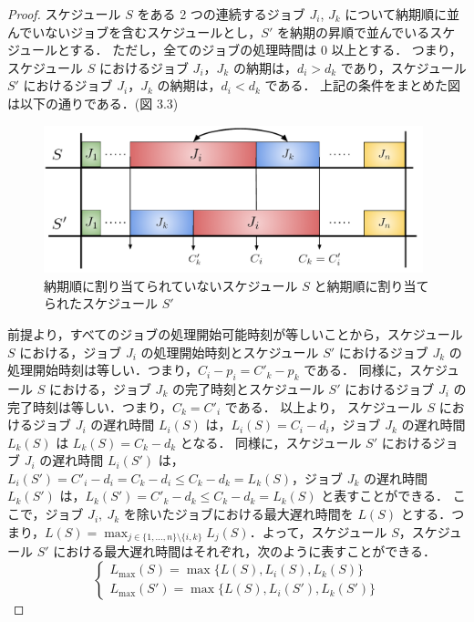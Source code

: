 \documentclass[12pt]{optlab-bachelor}
\begin{document}
\begin{proof}
  スケジュール $S$ をある 2 つの連続するジョブ $J_i$, $J_k$ について納期順に並んでいないジョブを含むスケジュールとし，$S'$ を納期の昇順で並んでいるスケジュールとする．
  ただし，全てのジョブの処理時間は 0 以上とする．
  つまり，スケジュール $S$ におけるジョブ $J_i$，$J_k$ の納期は，$d_i > d_k$ であり，スケジュール $S'$ におけるジョブ $J_i$，$J_k$ の納期は，$d_i < d_k$ である．
  上記の条件をまとめた図は以下の通りである．(図 3.3)

  \begin{figure}[h]
    \centering
    \includegraphics[width = 11cm]{figure/EDDrule.pdf}
    \caption{納期順に割り当てられていないスケジュール $S$ と納期順に割り当てられたスケジュール $S'$}
  \end{figure}

  前提より，すべてのジョブの処理開始可能時刻が等しいことから，スケジュール $S$ における，ジョブ $J_i$ の処理開始時刻とスケジュール $S'$ におけるジョブ $J_k$ の処理開始時刻は等しい．つまり，$C_i - p_i = C'_k - p_k$ である．
  同様に，スケジュール $S$ における，ジョブ $J_k$ の完了時刻とスケジュール $S'$ におけるジョブ $J_i$ の完了時刻は等しい．つまり，$C_k = C'_i$ である．
  以上より，
  スケジュール $S$ におけるジョブ $J_i$ の遅れ時間 $L_i(S)$ は，$L_i(S) = C_i - d_i$，ジョブ $J_k$ の遅れ時間 $L_k(S)$ は $L_k(S) = C_k - d_k$ となる．
  同様に，スケジュール $S'$ におけるジョブ $J_i$ の遅れ時間 $L_i(S')$ は，$L_i(S') = C'_i - d_i = C_k - d_i \le C_k - d_k = L_k(S)$，ジョブ $J_k$ の遅れ時間 $L_k(S')$ は，$L_k(S') = C'_k - d_k \le C_k - d_k = L_k(S)$ と表すことができる．
  ここで，ジョブ $J_i,\ J_k$ を除いたジョブにおける最大遅れ時間を $L(S)$
  とする．つまり，$L(S) = \displaystyle \max_{j \in \{1,\ldots,n\}
  \setminus \{i,k\}}L_j(S)$．よって，スケジュール $S$，スケジュール
  $S'$ における最大遅れ時間はそれぞれ，次のように表すことができる．
  \begin{displaymath}
    \left\{ \begin{array}{lll} L_{\max}(S) =
    \max\bigg\{L(S),L_i(S),L_k(S)\bigg\} \\ L_{\max}(S') =
    \max\bigg\{L(S),L_i(S'),L_k(S')\bigg\}\end{array} \right.
  \end{displaymath}


\end{proof}
\end{document}
